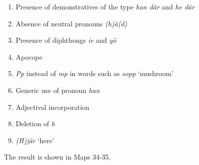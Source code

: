 \begin{enumerate} %
\item 
Presence of demonstratives of the type\textit{ han där} and \textit{he där}

\item 
Absence of neutral pronouns \textit{(h)ä(d)}

\item 
Presence of diphthongs \textit{ie} and \textit{yö}

\item 
Apocope

\item 
\textit{Pp} instead of \textit{mp }in words such as \textit{sopp} ‘mushroom’

\item 
Generic use of pronoun \textit{han}

\item 
Adjectival incorporation

\item 
Deletion of \textit{h}

\item 
\textit{(H)jär} ‘here’

\end{enumerate} %
The result is shown in Maps 34-35. 


